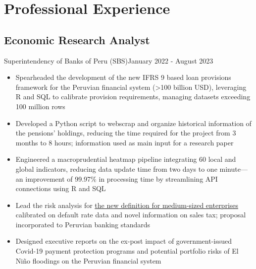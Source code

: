 \section{Professional Experience}
\subsection{Economic Research Analyst}{Superintendency of Banks of Peru (SBS)}{January 2022 - August 2023}
\begin{itemize}
    
    \item Spearheaded the development of the new IFRS 9 based loan provisions framework for the Peruvian financial system (>100 billion USD), leveraging R and SQL to calibrate provision requirements, managing datasets exceeding 100 million rows
    \item Developed a Python script to webscrap and organize historical information of the pensions' holdings, reducing the time required for the project from 3 months to 8 hours; information used as main input for a research paper
    \item Engineered a macroprudential heatmap pipeline integrating 60 local and global indicators, reducing data update time from two days to one minute—an improvement of 99.97\% in processing time by streamlining API connections using R and SQL
    \item Lead the risk analysis for \href{https://www.sbs.gob.pe/noticia/detallenoticia/idnoticia/2680}{the new definition for medium-sized enterprises} calibrated on default rate data and novel information on sales tax; proposal incorporated to Peruvian banking standards
    \item Designed executive reports on the ex-post impact of government-issued Covid-19 payment protection programs and potential portfolio risks of El Niño floodings on the Peruvian financial system

\end{itemize}
